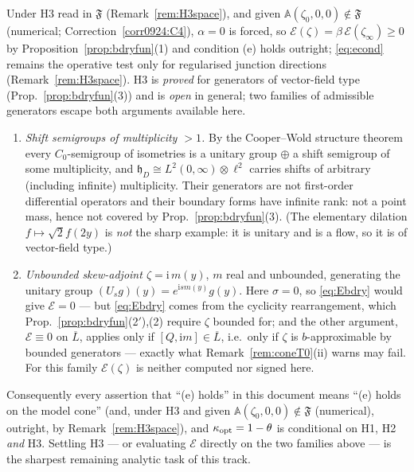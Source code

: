 \documentclass[11pt]{article}
\newcommand{\hh}{\mathfrak h}
\newcommand{\Aop}{\mathbb A}
\begin{document}
\begin{remark}\label{rem:H3}
Under H3 read in $\mathfrak F$ (Remark~\ref{rem:H3space}), and given $\Aop(\zeta_0,0,0)\notin\mathfrak F$ (numerical; Correction~\ref{corr0924:C4}), $\alpha=0$ is forced, so
$\mathcal E(\zeta)=\beta\,\mathcal E(\zeta_\infty)\ge0$ by Proposition~\ref{prop:bdryfun}(1)
and condition (e) holds outright; \eqref{eq:econd} remains the operative test only for
regularised junction directions (Remark~\ref{rem:H3space}).  H3 is
\emph{proved} for generators of vector-field type (Prop.~\ref{prop:bdryfun}(3)) and is
\emph{open} in general; two families of admissible generators escape both arguments
available here.
\begin{enumerate}[leftmargin=1.6em,itemsep=1pt]
\item \emph{Shift semigroups of multiplicity $>1$.}  By the Cooper--Wold structure theorem
 every $C_0$-semigroup of isometries is a unitary group $\oplus$ a shift semigroup of some
 multiplicity, and $\hh_D\cong L^2(0,\infty)\otimes\ell^2$ carries shifts of arbitrary
 (including infinite) multiplicity.  Their generators are not first-order differential
 operators and their boundary forms have infinite rank: not a point mass, hence not
 covered by Prop.~\ref{prop:bdryfun}(3).  (The elementary dilation $f\mapsto\sqrt2f(2y)$ is
 \emph{not} the sharp example: it is unitary and is a flow, so it is of vector-field type.)
\item \emph{Unbounded skew-adjoint $\zeta=\mathrm i\,m(y)$}, $m$ real and unbounded,
 generating the unitary group $(U_sg)(y)=e^{\mathrm i sm(y)}g(y)$.  Here $\sigma=0$, so
 \eqref{eq:Ebdry} would give $\mathcal E=0$ --- but \eqref{eq:Ebdry} comes from the
 cyclicity rearrangement, which Prop.~\ref{prop:bdryfun}(2$'$),(2) require $\zeta$ bounded
 for; and the other argument, $\mathcal E\equiv0$ on $\overline L$, applies only if
 $[Q,\mathrm i m]\in\overline L$, i.e.\ only if $\zeta$ is $b$-approximable by bounded
 generators --- exactly what Remark~\ref{rem:coneT0}(ii) warns may fail.  For this family
 $\mathcal E(\zeta)$ is neither computed nor signed here.
\end{enumerate}
Consequently every assertion that ``(e) holds'' in this document means ``(e) holds on the
model cone'' (and, under H3 and given $\Aop(\zeta_0,0,0)\notin\mathfrak F$ (numerical), outright, by Remark~\ref{rem:H3space}), and
$\kappa_{\rm opt}=1-\theta$ is conditional on H1, H2 \emph{and} H3.
Settling H3 --- or evaluating $\mathcal E$ directly on the two families above --- is the
sharpest remaining analytic task of this track.
\end{remark}
\end{document}
